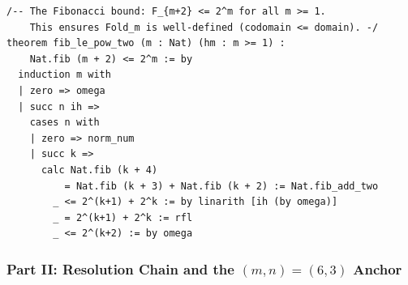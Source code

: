 \begin{lstlisting}[language=Lean4,caption={Zeckendorf legal language and Fibonacci counting}]
/-- The Fibonacci bound: F_{m+2} <= 2^m for all m >= 1.
    This ensures Fold_m is well-defined (codomain <= domain). -/
theorem fib_le_pow_two (m : Nat) (hm : m >= 1) :
    Nat.fib (m + 2) <= 2^m := by
  induction m with
  | zero => omega
  | succ n ih =>
    cases n with
    | zero => norm_num
    | succ k =>
      calc Nat.fib (k + 4)
          = Nat.fib (k + 3) + Nat.fib (k + 2) := Nat.fib_add_two
        _ <= 2^(k+1) + 2^k := by linarith [ih (by omega)]
        _ = 2^(k+1) + 2^k := rfl
        _ <= 2^(k+2) := by omega
\end{lstlisting}

\subsubsection*{Part II: Resolution Chain and the $(m,n)=(6,3)$ Anchor}

